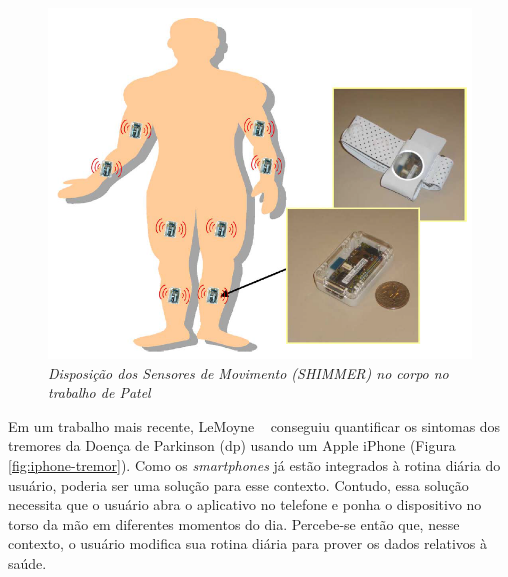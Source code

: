 \begin{figure}
 \centering
 \includegraphics[scale=0.3]{./img/patel-shimmer.png}
\caption[Disposição dos Sensores de Movimento (SHIMMER) no corpo no trabalho de Patel]{\textit{Disposição dos Sensores de Movimento (SHIMMER) no corpo no trabalho de Patel ~\cite{patel_monitoring_2009}}}
 \label{fig:patel-shimmer}
\end{figure}

Em um trabalho mais recente, LeMoyne ~\cite{lemoyne2010} conseguiu quantificar os sintomas dos tremores da Doença de Parkinson (\ac{dp}) usando um Apple iPhone (Figura \ref{fig:iphone-tremor}). Como os \textit{smartphones} já estão integrados à rotina diária do usuário, poderia ser uma solução para esse contexto. Contudo, essa solução necessita que o usuário abra o aplicativo no telefone e ponha o dispositivo no torso da mão em diferentes momentos do dia. Percebe-se então que, nesse contexto, o usuário modifica sua rotina diária para prover os dados relativos à saúde.

